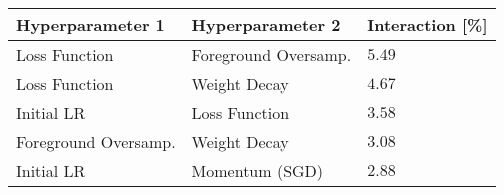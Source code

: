 \begin{tabular}{lll}
\toprule
Hyperparameter 1 & Hyperparameter 2 & Interaction [\%] \\
\midrule
Loss Function & Foreground Oversamp. & $5.49$ \\
Loss Function & Weight Decay & $4.67$ \\
Initial LR & Loss Function & $3.58$ \\
Foreground Oversamp. & Weight Decay & $3.08$ \\
Initial LR & Momentum (SGD) & $2.88$ \\
\bottomrule
\end{tabular}
